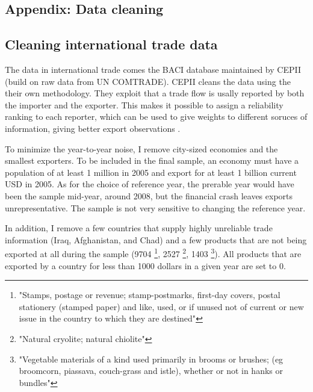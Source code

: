 \documentclass[11pt]{article}
\begin{document}

\newpage



\begin{appendices}

\newpage

\section{Appendix: Data cleaning}%
\label{sec:appendix_data_cleaning}

\subsection{Cleaning international trade data}%
\label{sub:cleaning_international_trade_data}

The data in international trade comes the BACI database maintained by CEPII (build on raw data from UN COMTRADE). CEPII cleans the data using the their own methodology. They exploit that a trade flow is usally reported by both the importer and the exporter. This makes it possible to assign a reliability ranking to each reporter, which can be used to give weights to different soruces of information, giving better export observations \citep{gualier_baci_2010}. 

To minimize the year-to-year noise, I remove city-sized economies and the smallest exporters. To be included in the final sample, an economy must have a population of at least 1 million in 2005 and export for at least 1 billion current USD in 2005. As for the choice of reference year, the prerable year would have been the sample mid-year, around 2008, but the financial crash leaves exports unrepresentative. The sample is not very sensitive to changing the reference year. 

In addition, I remove a few countries that supply highly unreliable trade information (Iraq, Afghanistan, and Chad) and a few products that are not being exported at all during the sample (9704 \footnote{"Stamps, postage or revenue; stamp-postmarks, first-day covers, postal stationery (stamped paper) and like, used, or if unused not of current or new issue in the country to which they are destined"}, 2527 \footnote{"Natural cryolite; natural chiolite"}, 1403 \footnote{"Vegetable materials of a kind used primarily in brooms or brushes; (eg broomcorn, piassava, couch-grass and istle), whether or not in hanks or bundles"}). All products that are exported by a country for less than 1000 dollars in a given year are set to 0. 


\end{appendices}
\end{document}
